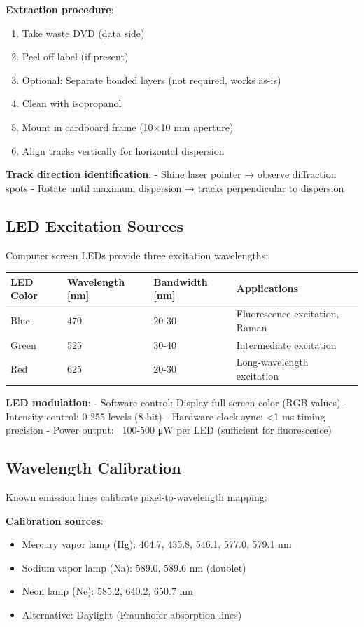 \documentclass[12pt,a4paper]{article}
\begin{document}
\textbf{Extraction procedure}:
\begin{enumerate}
\item Take waste DVD (data side)
\item Peel off label (if present)
\item Optional: Separate bonded layers (not required, works as-is)
\item Clean with isopropanol
\item Mount in cardboard frame (10×10 mm aperture)
\item Align tracks vertically for horizontal dispersion
\end{enumerate}

\textbf{Track direction identification}:
- Shine laser pointer → observe diffraction spots
- Rotate until maximum dispersion → tracks perpendicular to dispersion

\subsection{LED Excitation Sources}

Computer screen LEDs provide three excitation wavelengths:

\begin{center}
\begin{tabular}{|l|l|l|l|}
\hline
\textbf{LED Color} & \textbf{Wavelength [nm]} & \textbf{Bandwidth [nm]} & \textbf{Applications} \\
\hline
Blue & 470 & 20-30 & Fluorescence excitation, Raman \\
Green & 525 & 30-40 & Intermediate excitation \\
Red & 625 & 20-30 & Long-wavelength excitation \\
\hline
\end{tabular}
\end{center}

\textbf{LED modulation}:
- Software control: Display full-screen color (RGB values)
- Intensity control: 0-255 levels (8-bit)
- Hardware clock sync: <1 ms timing precision
- Power output: ~100-500 μW per LED (sufficient for fluorescence)

\subsection{Wavelength Calibration}

Known emission lines calibrate pixel-to-wavelength mapping:

\textbf{Calibration sources}:
\begin{itemize}
\item Mercury vapor lamp (Hg): 404.7, 435.8, 546.1, 577.0, 579.1 nm
\item Sodium vapor lamp (Na): 589.0, 589.6 nm (doublet)
\item Neon lamp (Ne): 585.2, 640.2, 650.7 nm
\item Alternative: Daylight (Fraunhofer absorption lines)
\end{itemize}
\end{document}
